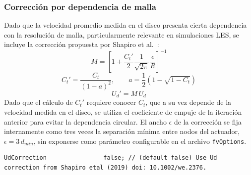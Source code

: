 \subsubsection{Corrección por dependencia de malla}

Dado que la velocidad promedio medida en el disco presenta cierta dependencia con la resolución de malla, particularmente relevante en simulaciones LES, se incluye la corrección propuesta por Shapiro et al.~\citep{shapiro2019}:
\begin{equation}
M = \left[1 + \frac{C_t'}{2}\frac{1}{\sqrt{2\pi}}\frac{\epsilon}{R}\right]^{-1}
\label{eq:shapiro_M}
\end{equation}
\begin{equation}
C_t' = \frac{C_t}{(1-a)^2}, \qquad a = \frac{1}{2}\left(1-\sqrt{1-C_t}\right)
\label{eq:shapiro_ct}
\end{equation}
\begin{equation}
U_d' = M \, U_d
\label{eq:shapiro_ud}
\end{equation}
Dado que el cálculo de $C_t'$ requiere conocer $C_t$, que a su vez depende de la velocidad medida en el disco, se utiliza el coeficiente de empuje de la iteración anterior para evitar la dependencia circular. El ancho $\epsilon$ de la corrección se fija internamente como tres veces la separación mínima entre nodos del actuador, $\epsilon = 3\,d_{min}$, sin exponerse como parámetro configurable en el archivo \texttt{fvOptions}.

\begin{scriptsize}
\begin{verbatim}
UdCorrection                false; // (default false) Use Ud correction from Shapiro etal (2019) doi: 10.1002/we.2376.
\end{verbatim}
\end{scriptsize}

